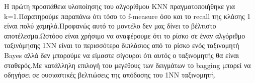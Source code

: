 Η πρώτη προσπάθεια υλοποίησης του αλγορίθμου KNN πραγματοποιήθηκε για k=1.Παρατηρούμε παραπάνω ότι τόσο το f-measure όσο και το recall της κλάσης 1 είναι πολύ χαμηλά.Προφανώς αυτό το μοντέλο δεν μας δίνει το βέλτιστο αποτέλεσμα.Ωστόσο είναι χρήσιμο να αναφέρουμε ότι το ρίσκο σε έναν αλγόριθμο ταξινόμησης 1NN είναι το περισσότερο διπλάσιος από το ρίσκο ενός ταξινομητή Bayes αλλά δεν μπορούμε να είμαστε σίγουροι ότι αυτός ο ταξινομητής θα είναι σταθερός.Με κατάλληλη επιλογή του μεγέθους των δειγμάτων το bagging μπορεί να οδηγήσει σε ουσιαστικές βελτιώσεις της απόδοσης του 1ΝΝ ταξινομητή.

